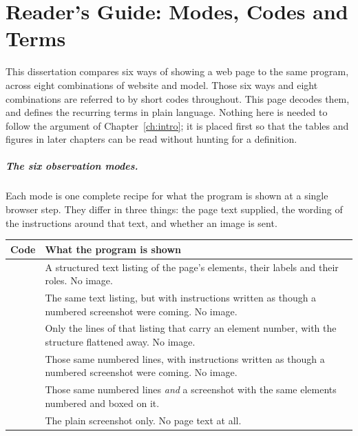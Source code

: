 
\clearpage
{
    \pagestyle{guide}
    \chapter*{Reader's Guide: Modes, Codes and Terms}

This dissertation compares six ways of showing a web page to the same program,
across eight combinations of website and model. Those six ways and eight
combinations are referred to by short codes throughout. This page decodes them,
and defines the recurring terms in plain language. Nothing here is needed to
follow the argument of Chapter~\ref{ch:intro}; it is placed first so that the
tables and figures in later chapters can be read without hunting for a
definition.

\paragraph{The six observation modes.} Each mode is one complete recipe for what
the program is shown at a single browser step. They differ in three things: the
page text supplied, the wording of the instructions around that text, and
whether an image is sent.

\begin{center}\small
\begin{tabularx}{\textwidth}{@{}lX@{}}
\toprule
Code & What the program is shown \\
\midrule
\mDOM{}  & A structured text listing of the page's elements, their labels and
           their roles. No image. \\
\mPP{}   & The same text listing, but with instructions written as though a
           numbered screenshot were coming. No image. \\
\mPT{}   & Only the lines of that listing that carry an element number, with
           the structure flattened away. No image. \\
\mPS{}   & Those same numbered lines, with instructions written as though a
           numbered screenshot were coming. No image. \\
\mSoM{}  & Those same numbered lines \emph{and} a screenshot with the same
elements numbered and boxed on it. \\
\mVis{}  & The plain screenshot only. No page text at all. \\
\bottomrule
\end{tabularx}
\end{center}

}
